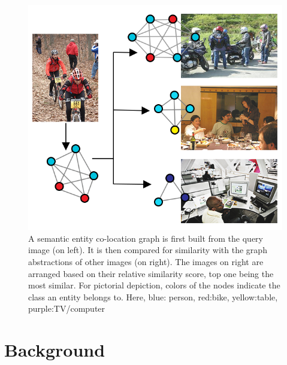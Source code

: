 \documentclass[conference]{IEEEtran}
\begin{document}
\begin{figure}
  \includegraphics[width=\linewidth]{Co-Loc-Diagram}
  \caption{A semantic entity co-location graph is first built from the query image (on left). It is then compared for similarity with the graph abstractions of other images (on right). The images on right are arranged based on their relative similarity score, top one being the most similar. For pictorial depiction, colors of the nodes indicate the class an entity belongs to. Here, blue: person, red:bike, yellow:table, purple:TV/computer   }
  \label{fig:C0-Loc-Diagram}
\end{figure}

\section{Background}
\end{document}
